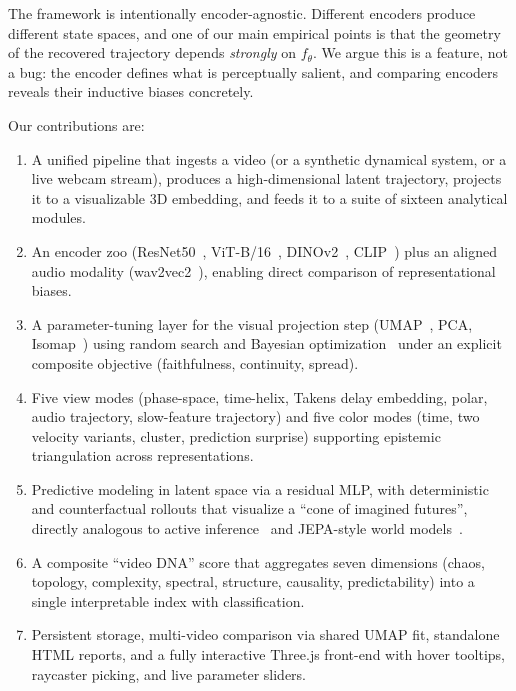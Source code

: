 \documentclass[11pt,a4paper]{article}
\begin{document}
The framework is intentionally encoder-agnostic. Different encoders
produce different state spaces, and one of our main empirical points
is that the geometry of the recovered trajectory depends
\emph{strongly} on $f_\theta$. We argue this is a feature, not a bug:
the encoder defines what is perceptually salient, and comparing
encoders reveals their inductive biases concretely.

Our contributions are:
\begin{enumerate}[leftmargin=*,topsep=2pt,itemsep=2pt]
    \item A unified pipeline that ingests a video (or a synthetic
    dynamical system, or a live webcam stream), produces a
    high-dimensional latent trajectory, projects it to a visualizable
    3D embedding, and feeds it to a suite of sixteen analytical
    modules.
    \item An encoder zoo (ResNet50~\cite{he2016deep},
    ViT-B/16~\cite{dosovitskiy2020vit},
    DINOv2~\cite{oquab2023dinov2},
    CLIP~\cite{radford2021clip}) plus an aligned audio modality
    (wav2vec2~\cite{baevski2020wav2vec2}), enabling direct
    comparison of representational biases.
    \item A parameter-tuning layer for the visual projection step
    (UMAP~\cite{mcinnes2018umap}, PCA, Isomap~\cite{tenenbaum2000isomap})
    using random search and Bayesian
    optimization~\cite{snoek2012bayesian} under an explicit composite
    objective (faithfulness, continuity, spread).
    \item Five view modes (phase-space, time-helix, Takens delay
    embedding, polar, audio trajectory, slow-feature trajectory) and
    five color modes (time, two velocity variants, cluster, prediction
    surprise) supporting epistemic triangulation across representations.
    \item Predictive modeling in latent space via a residual MLP, with
    deterministic and counterfactual rollouts that visualize a
    ``cone of imagined futures'', directly analogous to active
    inference~\cite{friston2010free} and JEPA-style world
    models~\cite{lecun2022path}.
    \item A composite ``video DNA'' score that aggregates seven
    dimensions (chaos, topology, complexity, spectral, structure,
    causality, predictability) into a single interpretable index
    with classification.
    \item Persistent storage, multi-video comparison via shared
    UMAP fit, standalone HTML reports, and a fully interactive
    Three.js front-end with hover tooltips, raycaster picking, and
    live parameter sliders.
\end{enumerate}
\end{document}
